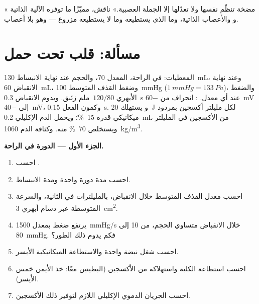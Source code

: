 \begin{exercise}[$\star\star\star$]\label{exo:b2:heart:12}
« مضخة تنظّم نفسها ولا تعدّلها إلا
الجملة العصبية.» ناقش، مميّزًا ما توفره الآلية الذاتية و
 والأعصاب الذاتية، وما الذي
يستطيعه وما لا يستطيعه  مزروع --- وهو بلا أعصاب.
\end{exercise}

\section{مسألة: قلب تحت حمل}

\begin{problem}
\label{pb:b2:heart:1}
المعطيات: في الراحة، المعدل 70، والحجم عند نهاية الانبساط \qty{130}{mL}،
وعند نهاية الانقباض \qty{60}{mL}، وضغط القذف المتوسط \qty{100}{mmHg}
($\qty{1}{mmHg} = \qty{133}{Pa}$)، والضغط الأبهري $120/80$~ملم زئبق.
ويدوم الانقباض \qty{0.3}{s} عند أي معدل. : انجراف من
\qty{-60}{mV} إلى \qty{-40}{mV}، وكمون الفعل \qty{0.15}{s}. و
يستهلك  \qty{20}{J} لكل مليلتر أكسجين بمردود
ميكانيكي قدره \qty{15}{\%}؛ ويحمل الدم الإكليلي
\qty{0.2}{mL} من الأكسجين في المليلتر ويستخلص 
\qty{70}{\%} منه. وكثافة الدم \qty{1060}{kg/m^3}.

\medskip
\noindent\textbf{الجزء الأول --- الدورة في الراحة.}
\begin{enumerate}
  \item احسب   .
  \item احسب مدة دورة واحدة ومدة الانبساط.
  \item احسب معدل القذف المتوسط خلال الانقباض،
        بالمليلترات في الثانية، والسرعة المتوسطة عبر
        دسام أبهري \qty{3}{cm^2}.
  \item يرتفع ضغط  بمعدل \qty{1500}{mmHg/s} خلال
        الانقباض متساوي الحجم، من 10 إلى \qty{80}{mmHg}. فكم
        يدوم ذلك الطور؟
  \item احسب شغل نبضة واحدة والاستطاعة الميكانيكية
         الأيسر.
  \item احسب استطاعة  الكلية واستهلاكه من الأكسجين
        (البطينين معًا: خذ الأيمن خمس الأيسر).
  \item احسب الجريان الدموي الإكليلي اللازم لتوفير ذلك الأكسجين.
\end{enumerate}


\end{problem}
